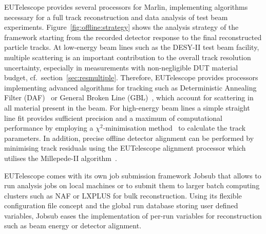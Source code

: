 EUTelescope provides several processors for Marlin, implementing algorithms necessary for a full track reconstruction and data analysis of test beam experiments. 
Figure~\ref{fig:offline:strategy} shows the analysis strategy of the framework starting from the recorded detector response to the final reconstructed particle tracks. 
At low-energy beam lines such as the DESY-II test beam facility, multiple scattering is an important contribution to the overall track resolution uncertainty,
 especially in measurements with non-negligible DUT material budget, cf.\ section~\ref{sec:resmultiple}.
Therefore, EUTelescope provides processors implementing advanced algorithms for tracking such as Deterministic Annealing Filter (DAF)~\cite{ref:daffitter}
 or General Broken Line (GBL)~\cite{Blobel20111760,Kleinwort-2012}, which account for scattering in all material present in the beam.
For high-energy beam lines a simple straight line fit provides sufficient precision and a maximum of computational performance by employing a $\chi^{2}$-minimisation method~\cite{ref:eudetmemo_2007_01,ref:lutzpaper} to calculate the track parameters.
In addition, precise offline detector alignment can be performed by minimising track residuals using the EUTelescope alignment processor which utilises the Millepede-II algorithm~\cite{Blobel-2006}.

EUTelescope comes with its own job submission framework Jobsub that allows to run analysis jobs on local machines or to submit them to larger batch computing clusters such as NAF or LXPLUS for bulk reconstruction.
Using its flexible configuration file concept and the global run database storing user defined variables,
 Jobsub eases the implementation of per-run variables for reconstruction such as beam energy or detector alignment.
